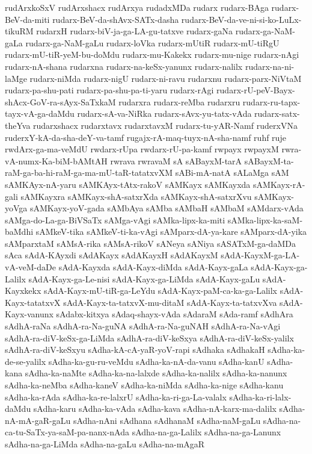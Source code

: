 {rudArxkoSxV
rudArxshacx
rudArxya
rudadxMDa
rudarx
rudarx-BAga
rudarx-BeV-da-miti
rudarx-BeV-da-shAvx-SATx-dasha
rudarx-BeV-da-ve-ni-si-ko-LuLx-tikuRM
rudarxH
rudarx-biV-ja-ga-LA-gu-tatxve
rudarx-gaNa
rudarx-ga-NaM-gaLa
rudarx-ga-NaM-gaLu
rudarx-loVka
rudarx-mUtiR
rudarx-mU-tiRgU
rudarx-mU-tiR-yeM-bu-doMdu
rudarx-mu-Kakekx
rudarx-mu-nige
rudarx-nAgi
rudarx-nA-shana
rudarxna
rudarx-na-keSx-yanunx
rudarx-nalilx
rudarx-na-ni-laMge
rudarx-niMda
rudarx-nigU
rudarx-ni-ravu
rudarxnu
rudarx-parx-NiVtaM
rudarx-pa-shu-pati
rudarx-pa-shu-pa-ti-yaru
rudarx-rAgi
rudarx-rU-peV-Bayx-shAcx-GoV-ra-sAyx-SaTxkaM
rudarxra
rudarx-reMba
rudarxru
rudarx-ru-tapx-tayx-vA-ga-daMdu
rudarx-sA-va-NiRka
rudarx-sAvx-yu-tatx-vAda
rudarx-satx-theYva
rudarxshacx
rudarxtavx
rudarxtavxM
rudarx-tu-yAR-Namf
ruderxVNa
ruderxY-kA-da-sha-deY-va-tamf
rugajx-rA-maq-tuyx-nA-sha-namf
ruhf
ruje
rwdArx-ga-ma-veMdU
rwdarx-rUpa
rwdarx-rU-pa-kamf
rwpayx
rwpayxM
rwra-vA-numx-Ka-biM-bAMtAH
rwrava
rwravaM
sA
sABayxM-tarA
sABayxM-ta-raM-ga-ba-hi-raM-ga-ma-mU-taR-tatatxvXM
sABi-mA-natA
sALaMga
sAM
sAMKAyx-nA-yaru
sAMKAyx-tAtx-rakoV
sAMKayx
sAMKayxda
sAMKayx-rA-gali
sAMKayxra
sAMKayx-shA-satxrXda
sAMKayx-shA-satxrXvu
sAMKayx-yoVga
sAMKayx-yoV-gada
sAMbAya
sAMba
sAMbaH
sAMbaM
sAMdarx-vAda
sAMga-do-La-ga-BiVSaTx
sAMga-vAgi
sAMka-lipx-ka-miti
sAMka-lipx-ka-saM-baMdhi
sAMkeV-tika
sAMkeV-ti-ka-vAgi
sAMparx-dA-ya-kare
sAMparx-dA-yika
sAMparxtaM
sAMsA-rika
sAMsA-rikoV
sANeya
sANiya
sASATxM-ga-daMDa
sAca
sAdA-KAyxdi
sAdAKayx
sAdAKayxH
sAdAKayxM
sAdA-KayxM-ga-LA-vA-veM-daDe
sAdA-Kayxda
sAdA-Kayx-diMda
sAdA-Kayx-gaLa
sAdA-Kayx-ga-Lalilx
sAdA-Kayx-ga-Le-nisi
sAdA-Kayx-ga-LiMda
sAdA-Kayx-gaLu
sAdA-Kayxkekx
sAdA-Kayx-mU-tiR-ga-LeYdu
sAdA-Kayx-paM-ca-ka-ga-Lalilx
sAdA-Kayx-tatatxvX
sAdA-Kayx-ta-tatxvX-mu-ditaM
sAdA-Kayx-ta-tatxvXva
sAdA-Kayx-vanunx
sAdabx-kitxya
sAdaq-shayx-vAda
sAdaraM
sAda-ramf
sAdhAra
sAdhA-raNa
sAdhA-ra-Na-guNA
sAdhA-ra-Na-guNAH
sAdhA-ra-Na-vAgi
sAdhA-ra-diV-keSx-ga-LiMda
sAdhA-ra-diV-keSxya
sAdhA-ra-diV-keSx-yalilx
sAdhA-ra-diV-keSxyu
sAdha-kA-cA-yaR-yoV-rapi
sAdhaka
sAdhakaH
sAdha-ka-de-se-yalilx
sAdha-ka-gu-ru-veMdu
sAdha-ka-nA-da-vanu
sAdha-kanU
sAdha-kana
sAdha-ka-naMte
sAdha-ka-na-lalxde
sAdha-ka-nalilx
sAdha-ka-nanunx
sAdha-ka-neMba
sAdha-kaneV
sAdha-ka-niMda
sAdha-ka-nige
sAdha-kanu
sAdha-ka-rAda
sAdha-ka-re-lalxrU
sAdha-ka-ri-ga-La-valalx
sAdha-ka-ri-lalx-daMdu
sAdha-karu
sAdha-ka-vAda
sAdha-kava
sAdha-nA-karx-ma-dalilx
sAdha-nA-mA-gaR-gaLu
sAdha-nAni
sAdhana
sAdhanaM
sAdha-naM-gaLu
sAdha-na-ca-tu-SaTx-ya-saM-pa-nanx-nAda
sAdha-na-ga-Lalilx
sAdha-na-ga-Lanunx
sAdha-na-ga-LiMda
sAdha-na-gaLu
sAdha-na-mAgaR
}
